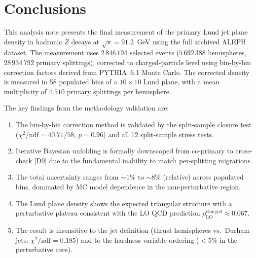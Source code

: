 \documentclass[11pt,a4paper]{article}
\begin{document}
\section{Conclusions}
\label{sec:conclusions}

This analysis note presents the final measurement of the primary Lund
jet plane density in hadronic $Z$ decays at $\sqrt{s} = 91.2$~GeV
using the full archived ALEPH dataset.  The measurement uses
$2\,846\,194$ selected events ($5\,692\,388$ hemispheres,
$28\,934\,792$ primary splittings), corrected to charged-particle
level using bin-by-bin correction factors derived from PYTHIA~6.1 Monte
Carlo.  The corrected density is measured in 58 populated bins of a
$10 \times 10$ Lund plane, with a mean multiplicity of $4.510$ primary
splittings per hemisphere.

The key findings from the methodology validation are:
\begin{enumerate}
\item The bin-by-bin correction method is validated by the
  split-sample closure test ($\chi^2/\text{ndf} = 40.71/58$,
  $p = 0.96$) and all 12 split-sample stress tests.
\item Iterative Bayesian unfolding is formally downscoped from
  co-primary to cross-check [D9] due to the fundamental inability
  to match per-splitting migrations.
\item The total uncertainty ranges from $\sim\!1\%$ to $\sim\!8\%$
  (relative) across populated bins, dominated by MC model dependence
  in the non-perturbative region.
\item The Lund plane density shows the expected triangular structure
  with a perturbative plateau consistent with the LO QCD prediction
  $\rho_\text{LO}^\text{charged} \approx 0.067$.
\item The result is insensitive to the jet definition (thrust
  hemispheres vs.\ Durham jets: $\chi^2/\text{ndf} = 0.185$) and
  to the hardness variable ordering ($<\!5\%$ in the perturbative core).
\end{enumerate}
\end{document}
